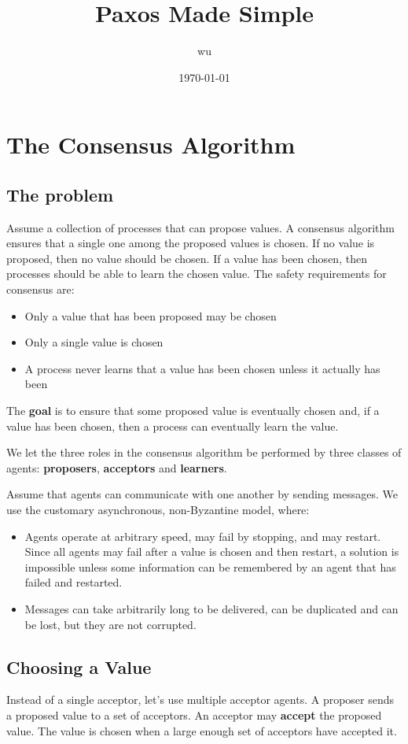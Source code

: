 \documentclass[11pt]{article}
\author{wu}
\date{\today}
\title{Paxos Made Simple}
\begin{document}
\maketitle
\tableofcontents

\section{The Consensus Algorithm}
\label{sec:org72551da}
\subsection{The problem}
\label{sec:orgea35aa9}
Assume a collection of processes that can propose values. A consensus algorithm ensures that a single
one among the proposed values is chosen. If no value is proposed, then no value should be chosen. If a value
has been chosen, then processes should be able to learn the chosen value. The safety requirements for
consensus are:
\begin{itemize}
\item Only a value that has been proposed may be chosen
\item Only a single value is chosen
\item A process never learns that a value has been chosen unless it actually has been
\end{itemize}

The \textbf{goal} is to ensure that some proposed value is eventually chosen and, if a value has been chosen,
then a process can eventually learn the value.

We let the three roles in the consensus algorithm be performed by three classes of agents: \textbf{proposers},
\textbf{acceptors} and \textbf{learners}.

Assume that agents can communicate with one another by sending messages. We use the customary
asynchronous, non-Byzantine model, where:
\begin{itemize}
\item Agents operate at arbitrary  speed, may fail by stopping, and may restart. Since all agents may fail
after a value is chosen and then restart, a solution is impossible unless some information can be
remembered by an agent that has failed and restarted.
\item Messages can take arbitrarily long to be delivered, can be duplicated and can be lost, but they are
not corrupted.
\end{itemize}
\subsection{Choosing a Value}
\label{sec:org6ff7414}
Instead of a single acceptor, let's use multiple acceptor agents. A proposer sends a proposed value to
a set of acceptors. An acceptor may \textbf{accept} the proposed value. The value is chosen when a large enough
set of acceptors have accepted it.
\end{document}
